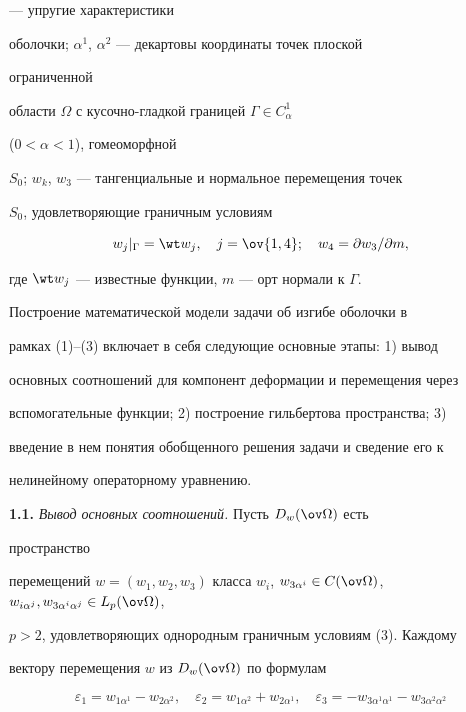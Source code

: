 --- упругие характеристики 


оболочки; $\alpha^1$, $\alpha^2$ --- декартовы координаты точек плоской 


ограниченной 


области $\Omega$ с кусочно-гладкой границей $\Gamma\in C^1_\alpha$ 


($0<\alpha<1$), гомеоморфной 


$S_0$; $w_k$, $w_3$ --- тангенциальные и нормальное перемещения точек 


$S_0$, удовлетворяющие граничным условиям 


\begin{equation} 


w_j|_\Gamma=\wt w_j,\quad j=\ov{1,4};\quad 


w_4=\partial w_3/\partial m, 


\end{equation} 


где $\wt w_j$ --- известные функции, $m$ --- орт нормали к $\Gamma$. 


 


Построение математической модели задачи об изгибе оболочки в 


рамках (1)--(3) включает в себя следующие основные этапы: 1) вывод 


основных соотношений для компонент деформации и перемещения через 


вспомогательные функции; 2) построение гильбертова пространства; 3) 


введение в нем понятия обобщенного решения задачи и сведение его к 


нелинейному операторному уравнению. 


\medskip 





 


{\bf 1.1.} {\it Вывод основных соотношений.} Пусть $D_w(\ov\Omega)$ есть 


пространство 


перемещений $w=(w_1,w_2,w_3)$ класса $w_i$, $w_{3\alpha^i}\in 


C(\ov\Omega)$, $w_{i\alpha^j},w_{3\alpha^i\alpha^j}\in L_p(\ov\Omega)$, 


$p>2$, удовлетворяющих однородным граничным условиям (3). Каждому 


вектору перемещения $w$ из $D_w(\ov\Omega)$ по формулам 


\begin{equation} 


\varepsilon_1=w_{1\alpha^1}-w_{2\alpha^2},\quad 


\varepsilon_2=w_{1\alpha^2}+w_{2\alpha^1},\quad 


\varepsilon_3=-w_{3\alpha^1\alpha^1}-w_{3\alpha^2\alpha^2} 


\end{equation} 


